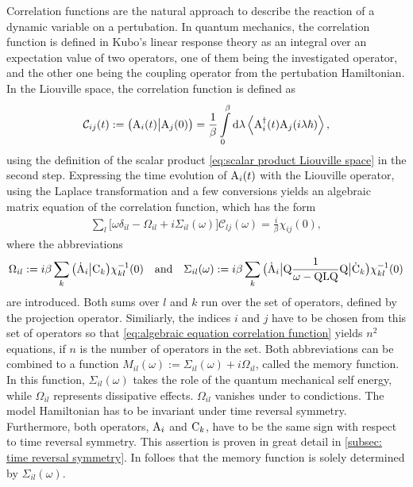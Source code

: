 Correlation functions are the natural approach to describe the reaction of a dynamic variable on a pertubation.
In quantum mechanics, the correlation function is defined in Kubo's linear response theory as an integral over an expectation value of two operators, one of them being the investigated operator, and the other one being the coupling operator from the pertubation Hamiltonian.
In the Liouville space, the correlation function is defined as
%
\begin{align}
	\mathcal{C}_{ij}(t) := \big({\mathrm{A}_{i}(t)}\big|{\mathrm{A}_{j}(0)}\big) = \frac{1}{\beta} \int\limits_{0}^{\beta} \dd{\lambda} \expval{\mathrm{A}_{i}^{\dag}(t) \mathrm{A}_{j}(i\lambda\hbar)},
	\label{eq:correlation function in LS}
\end{align}
%
using the definition of the scalar product \eqref{eq:scalar product Liouville space}  in the second step.
Expressing the time evolution of $\mathrm{A}_{i}(t)$ with the Liouville operator, using the Laplace transformation and a few conversions yields an algebraic matrix equation of the correlation function, which has the form
%
\begin{align}
	\sum\limits_{l} \Big[\omega \delta_{il} - \Omega_{il} + i \Sigma_{il}(\omega)\Big] \mathcal{C}_{lj}(\omega) = \frac{i}{\beta} \chi_{ij}(0),
	\label{eq:algebraic equation correlation function}
\end{align}
%
where the abbreviations 
%
\begin{align}
	\Omega_{il} := i \beta \sum\limits_{k} \obraket{\dot{\mt{A}}_{i}}{\mt{C}_{k}} \chi_{kl}^{-1}(0)
	\qq{and}
	\Sigma_{il}(\omega) := i \beta \sum\limits_{k} \obra{\dot{\mt{A}}_{i}} \mt{Q} \frac{1}{\omega - \mt{QLQ}} \mt{Q} \oket{\dot{\mt{C}}_{k}} \chi_{kl}^{-1}(0)
	\label{eq:Omega&Sigma}
\end{align}
%
are introduced.
Both sums over $l$ and $k$ run over the set of operators, defined by the projection operator.
Similiarly, the indices $i$ and $j$ have to be chosen from this set of operators so that \eqref{eq:algebraic equation correlation function} yields $n^{2}$ equations, if $n$ is the number of operators in the set.
Both abbreviations can be combined to a function $M_{il}(\omega) := \Sigma_{il}(\omega) +i \Omega_{il}$, called the memory function.
In this function, $\Sigma_{il}(\omega)$ takes the role of the quantum mechanical self energy, while $\Omega_{il}$ represents dissipative effects.
$\Omega_{il}$ vanishes under to condictions.
The model Hamiltonian has to be invariant under time reversal symmetry.
Furthermore, both operators, $\mathrm{A}_{i}$ and $\mathrm{C}_{k}$, have to be the same sign with respect to time reversal symmetry.
This assertion is proven in great detail in \ref{subsec: time reversal symmetry}.
In folloes that the memory function is solely determined by $\Sigma_{il}(\omega)$.

